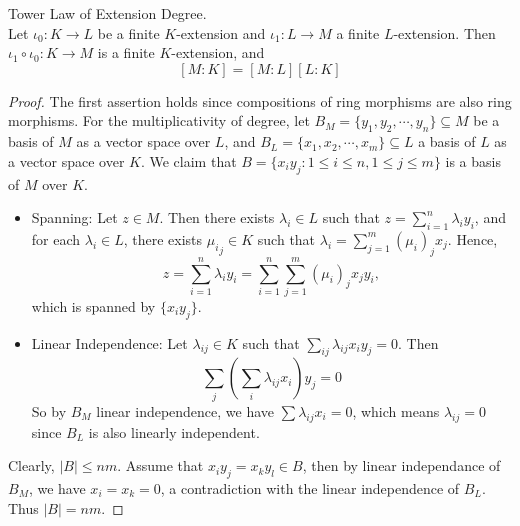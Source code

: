 \documentclass[../book.tex]{subfiles}
\begin{document}



\begin{thm} Tower Law of Extension Degree. \\
Let $\iota_0 : K \to L$ be a finite $K$-extension and 
$\iota_1 : L \to M$ a finite $L$-extension.
Then $\iota_1 \circ \iota_0 : K \to M$ is a finite $K$-extension, and 
\[
    [M : K]=[M : L][L : K]
\]
\end{thm}
\begin{proof}
The first assertion holds since compositions 
of ring morphisms are also ring morphisms. 
For the multiplicativity of degree, 
let $B_M=\{y_1,y_2,\cdots,y_n\} \subseteq M$ be a basis of $M$ 
as a vector space over $L$, 
and $B_L=\{x_1,x_2,\cdots,x_m\} \subseteq L$ a basis of $L$ 
as a vector space over $K$.
We claim that $B = \{x_iy_j:1 \leq i \leq n, 1\leq j \leq m\}$ 
is a basis of $M$ over $K$.

\begin{itemize}
    \item Spanning: 
        Let $z \in M$. 
        Then there exists $\lambda_i \in L$ such that     $z=\displaystyle\sum_{i=1}^{n} \lambda_iy_i$, 
        and for each $\lambda_i \in L$, there exists ${\mu_i}_j \in K$ 
        such that $\lambda_i=\displaystyle\sum_{j=1}^{m} {(\mu_i)}_j x_j$. 
        Hence,\[
            z = \sum_{i=1}^{n} \lambda_iy_i = 
            \sum_{i=1}^{n} \sum_{j=1}^{m} {(\mu_i)}_j x_j y_i,
        \]
        which is spanned by $\{x_iy_j\}$.
    \item Linear Independence: 
        Let $\lambda_{ij} \in K$ such that 
        $\displaystyle\sum_{ij}\lambda_{ij} x_iy_j=0$. 
        Then \[\sum_j(\sum_i \lambda_{ij} x_i)y_j=0\]
        So by $B_M$ linear independence, 
        we have $\sum \lambda_{ij}x_i=0$, 
        which means $\lambda_{ij}=0$ 
        since $B_L$ is also linearly independent.
\end{itemize}
Clearly, $|B| \leq nm$. Assume that $x_i y_j = x_k y_l \in B$, 
then by linear independance of $B_M$, 
we have $x_i = x_k = 0$, a contradiction with the linear independence of $B_L$. 
Thus $|B| = nm$.
\end{proof}
\end{document}
